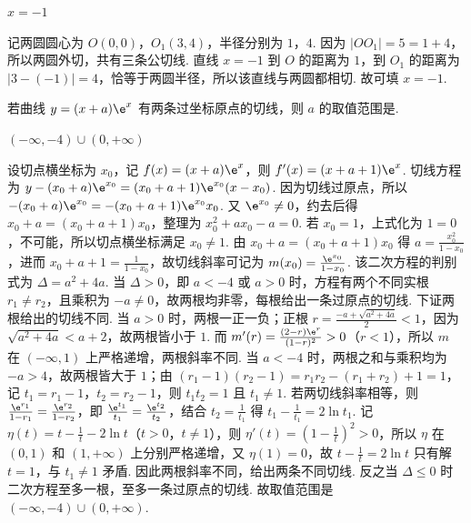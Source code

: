 \begin{answer}
\(x=-1\)
\end{answer}

\begin{solution}

记两圆圆心为 \(O(0,0)\)，\(O_1(3,4)\)，半径分别为 \(1\)，\(4\). 因为 \(\lvert OO_1\rvert=5=1+4\)，所以两圆外切，共有三条公切线. 直线 \(x=-1\) 到 \(O\) 的距离为 \(1\)，到 \(O_1\) 的距离为 \(\lvert 3-(-1)\rvert=4\)，恰等于两圆半径，所以该直线与两圆都相切. 故可填 \(x=-1\).
\end{solution}

\begin{problem}
若曲线 \(y=(x+a)\e^x\) 有两条过坐标原点的切线，则 \(a\) 的取值范围是\fillinblank{}.
\end{problem}

\begin{answer}
\((-\infty,-4)\cup(0,+\infty)\)
\end{answer}

\begin{solution}
设切点横坐标为 \(x_0\)，记 \(f(x)=(x+a)\e^x\)，则 \(f'(x)=(x+a+1)\e^x\). 切线方程为 \(y-(x_0+a)\e^{x_0}=(x_0+a+1)\e^{x_0}(x-x_0)\). 因为切线过原点，所以 \(-(x_0+a)\e^{x_0}=-(x_0+a+1)\e^{x_0}x_0\). 又 \(\e^{x_0}\ne 0\)，约去后得 \(x_0+a=(x_0+a+1)x_0\)，整理为 \(x_0^2+ax_0-a=0\). 若 \(x_0=1\)，上式化为 \(1=0\)，不可能，所以切点横坐标满足 \(x_0\ne 1\). 由 \(x_0+a=(x_0+a+1)x_0\) 得 \(a=\frac{x_0^2}{1-x_0}\)，进而 \(x_0+a+1=\frac{1}{1-x_0}\)，故切线斜率可记为 \(m(x_0)=\frac{\e^{x_0}}{1-x_0}\). 该二次方程的判别式为 \(\Delta=a^2+4a\). 当 \(\Delta>0\)，即 \(a<-4\) 或 \(a>0\) 时，方程有两个不同实根 \(r_1\ne r_2\)，且乘积为 \(-a\ne 0\)，故两根均非零，每根给出一条过原点的切线. 下证两根给出的切线不同. 当 \(a>0\) 时，两根一正一负；正根 \(r=\frac{-a+\sqrt{a^2+4a}}{2}<1\)，因为 \(\sqrt{a^2+4a}<a+2\)，故两根皆小于 \(1\). 而 \(m'(r)=\frac{(2-r)\e^r}{(1-r)^2}>0\)（\(r<1\)），所以 \(m\) 在 \((-\infty,1)\) 上严格递增，两根斜率不同. 当 \(a<-4\) 时，两根之和与乘积均为 \(-a>4\)，故两根皆大于 \(1\)；由 \((r_1-1)(r_2-1)=r_1r_2-(r_1+r_2)+1=1\)，记 \(t_1=r_1-1\)，\(t_2=r_2-1\)，则 \(t_1t_2=1\) 且 \(t_1\ne 1\). 若两切线斜率相等，则 \(\frac{\e^{r_1}}{1-r_1}=\frac{\e^{r_2}}{1-r_2}\)，即 \(\frac{\e^{t_1}}{t_1}=\frac{\e^{t_2}}{t_2}\)，结合 \(t_2=\frac{1}{t_1}\) 得 \(t_1-\frac{1}{t_1}=2\ln t_1\). 记 \(\eta(t)=t-\frac1t-2\ln t\)（\(t>0\)，\(t\ne 1\)），则 \(\eta'(t)=\left(1-\frac1t\right)^2>0\)，所以 \(\eta\) 在 \((0,1)\) 和 \((1,+\infty)\) 上分别严格递增，又 \(\eta(1)=0\)，故 \(t-\frac1t=2\ln t\) 只有解 \(t=1\)，与 \(t_1\ne 1\) 矛盾. 因此两根斜率不同，给出两条不同切线. 反之当 \(\Delta\le 0\) 时二次方程至多一根，至多一条过原点的切线. 故取值范围是 \((-\infty,-4)\cup(0,+\infty)\).
\end{solution}

